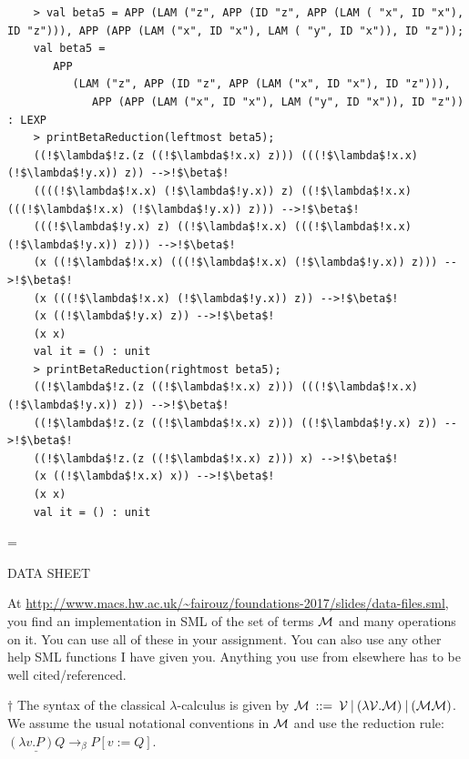 \documentclass[11pt]{article}
\newenvironment{neverbreak} %
{\par\nobreak\vfil\penalty0\vfilneg
	\vtop\bgroup}
{\par\xdef\tpd{\the\prevdepth}\egroup
	\prevdepth=\tpd}
\begin{document}
\begin{enumerate}
\begin{neverbreak}
\begin{verbatim}
	> val beta5 = APP (LAM ("z", APP (ID "z", APP (LAM ( "x", ID "x"), ID "z"))), APP (APP (LAM ("x", ID "x"), LAM ( "y", ID "x")), ID "z"));
	val beta5 =
	   APP
	      (LAM ("z", APP (ID "z", APP (LAM ("x", ID "x"), ID "z"))),
	         APP (APP (LAM ("x", ID "x"), LAM ("y", ID "x")), ID "z")) : LEXP
	> printBetaReduction(leftmost beta5);
	((!$\lambda$!z.(z ((!$\lambda$!x.x) z))) (((!$\lambda$!x.x) (!$\lambda$!y.x)) z)) -->!$\beta$!
	((((!$\lambda$!x.x) (!$\lambda$!y.x)) z) ((!$\lambda$!x.x) (((!$\lambda$!x.x) (!$\lambda$!y.x)) z))) -->!$\beta$!
	(((!$\lambda$!y.x) z) ((!$\lambda$!x.x) (((!$\lambda$!x.x) (!$\lambda$!y.x)) z))) -->!$\beta$!
	(x ((!$\lambda$!x.x) (((!$\lambda$!x.x) (!$\lambda$!y.x)) z))) -->!$\beta$!
	(x (((!$\lambda$!x.x) (!$\lambda$!y.x)) z)) -->!$\beta$!
	(x ((!$\lambda$!y.x) z)) -->!$\beta$!
	(x x)
	val it = () : unit
	> printBetaReduction(rightmost beta5);
	((!$\lambda$!z.(z ((!$\lambda$!x.x) z))) (((!$\lambda$!x.x) (!$\lambda$!y.x)) z)) -->!$\beta$!
	((!$\lambda$!z.(z ((!$\lambda$!x.x) z))) ((!$\lambda$!y.x) z)) -->!$\beta$!
	((!$\lambda$!z.(z ((!$\lambda$!x.x) z))) x) -->!$\beta$!
	(x ((!$\lambda$!x.x) x)) -->!$\beta$!
	(x x)
	val it = () : unit
\end{verbatim}
\end{neverbreak}

\end{enumerate}
\newpage

\begin{center}
\Huge{DATA SHEET}
\end{center}


At \url{http://www.macs.hw.ac.uk/~fairouz/foundations-2017/slides/data-files.sml}, you find an implementation in SML of the set of
terms ${\cal M}$ and many operations on it.  You can use all of these in your assignment.  You can also use any other help SML functions I have given you.  Anything you use from elsewhere has to be well cited/referenced.

$\dagger$ The syntax of the classical $\lambda$-calculus is given by
${\cal M}  \: ::=  \:  {\cal V} \:|\: ( \lambda{{\cal V}}.{{\cal M}}) \:|\: ( {\cal M} {\cal M})$.\\
We assume the usual notational conventions in ${\cal M}$ and use 
the reduction rule: \\$\underline{(\lambda v. P)Q} \rightarrow_\beta P[v:=Q]$.
\end{document}
